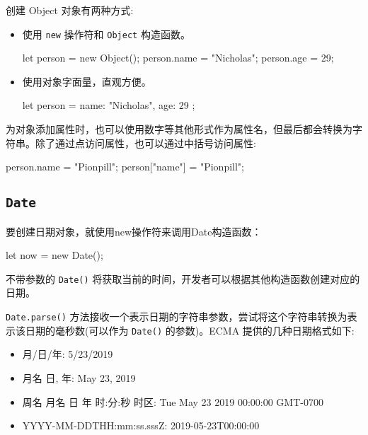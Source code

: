 
创建 Object 对象有两种方式:
\begin{itemize}
    \item 使用 \texttt{new} 操作符和 \texttt{Object} 构造函数。

\begin{JavaScript}
let person = new Object(); 
person.name = "Nicholas"; 
person.age = 29; 
\end{JavaScript}

    \item 使用对象字面量，直观方便。
    
\begin{JavaScript}
let person = {    
    name: "Nicholas",   
    age: 29 
}; 
\end{JavaScript}
\end{itemize}


为对象添加属性时，也可以使用数字等其他形式作为属性名，但最后都会转换为字符串。除了通过点访问属性，也可以通过中括号访问属性:

\begin{JavaScript}
person.name = "Pionpill";
person["name"] = "Pionpill";
\end{JavaScript}


\subsection{\texttt{Date}}

要创建日期对象，就使用new操作符来调用Date构造函数：

\begin{JavaScript}
let now = new Date();
\end{JavaScript}

不带参数的 \texttt{Date()} 将获取当前的时间，开发者可以根据其他构造函数创建对应的日期。

\texttt{Date.parse()} 方法接收一个表示日期的字符串参数，尝试将这个字符串转换为表示该日期的毫秒数(可以作为 \texttt{Date()} 的参数)。ECMA 提供的几种日期格式如下:
\begin{itemize}
    \item 月/日/年: 5/23/2019
    \item 月名 日, 年: May 23, 2019
    \item 周名 月名 日 年 时:分:秒 时区: Tue May 23 2019 00:00:00 GMT-0700
    \item YYYY-MM-DDTHH:mm:ss.sssZ: 2019-05-23T00:00:00
\end{itemize}

